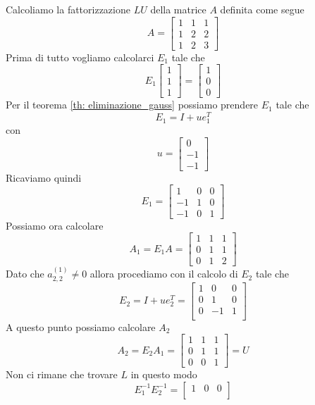 \begin{example}
	Calcoliamo la fattorizzazione $LU$ della matrice $A$ definita come segue
	\[ A = \begin{bmatrix}
			1 & 1 & 1 \\
			1 & 2 & 2 \\
			1 & 2 & 3
		\end{bmatrix}
	\]
	Prima di tutto vogliamo calcolarci $E_1$ tale che
	\[ E_1 \begin{bmatrix}
			1 \\ 1 \\ 1
		\end{bmatrix} = \begin{bmatrix}
			1 \\ 0 \\ 0
		\end{bmatrix}
	\]
	Per il teorema \ref{th: eliminazione_gauss} possiamo prendere $E_1$ tale che
	\[ E_1 = I + u e_1^T \]
	con
	\[ u = \begin{bmatrix} 0 \\ -1 \\ -1 \end{bmatrix} \]
	Ricaviamo quindi
	\[
		E_1 = \begin{bmatrix}
			1  & 0 & 0 \\
			-1 & 1 & 0 \\
			-1 & 0 & 1
		\end{bmatrix}
	\]
	Possiamo ora calcolare
	\[
		A_1 = E_1 A = \begin{bmatrix}
			1 & 1 & 1 \\
			0 & 1 & 1 \\
			0 & 1 & 2
		\end{bmatrix}
	\]
	Dato che $a_{2,2}^{(1)} \neq 0$ allora procediamo con il calcolo di $E_2$ tale che
	\[
		E_2 = I + u e_2^T = \begin{bmatrix}
			1 & 0  & 0 \\
			0 & 1  & 0 \\
			0 & -1 & 1 \\
		\end{bmatrix}
	\]
	A questo punto possiamo calcolare $A_2$
	\[
		A_2 = E_2 A_1 = \begin{bmatrix}
			1 & 1 & 1 \\
			0 & 1 & 1 \\
			0 & 0 & 1
		\end{bmatrix} = U
	\]
	Non ci rimane che trovare $L$ in questo modo
	\[
		E_1^{-1} E_2^{-1} = \begin{bmatrix}
			1 & 0 & 0 \\

\end{bmatrix}\]
\end{example}
